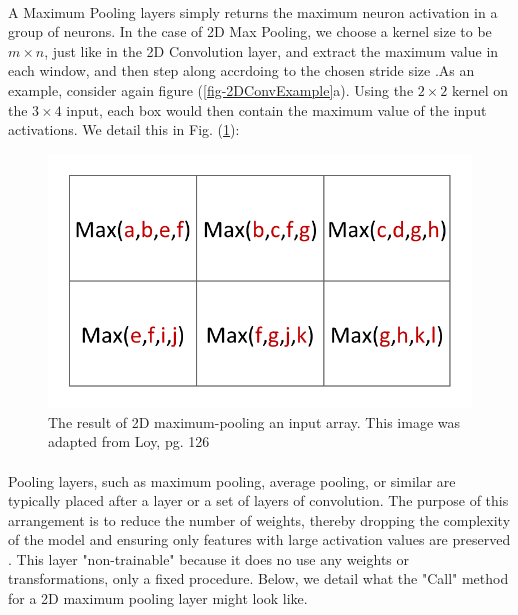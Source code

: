 \documentclass[12pt,letterpaper]{article}
\begin{document}
\paragraph*{}A Maximum Pooling layers simply returns the maximum neuron activation in a group of neurons. In the case of 2D Max Pooling, we choose a kernel size to be $m \times n$, just like in the 2D Convolution layer, and extract the maximum value in each window, and then step along accrdoing to the chosen stride size \cite{Loy,Goodfellow}.As an example, consider again figure (\ref{fig-2DConvExample}a). Using the $2 \times 2$ kernel on the $3 \times 4$ input, each box would then contain the maximum value of the input activations. We detail this in Fig. (\ref{fig-2DMaxPool}):
\begin{figure}[h]

\begin{center}
\includegraphics[scale=0.6]{../figures/2DConvExample(d)}
\end{center}
\caption{The result of 2D maximum-pooling an input array. This image was adapted from Loy, pg. 126 \cite{Loy}}
\label{fig-2DMaxPool}
\end{figure} 

\paragraph*{}Pooling layers, such as maximum pooling, average pooling, or similar are typically placed after a layer or a set of layers of convolution. The purpose of this arrangement is to reduce the number of weights, thereby dropping the complexity of the model and ensuring only features with large activation values are preserved \cite{Geron,Loy,Goodfellow}. This layer "non-trainable" because it does no use any weights or transformations, only a fixed procedure. Below, we detail what the "Call" method for a 2D maximum pooling layer might look like.
\end{document}
